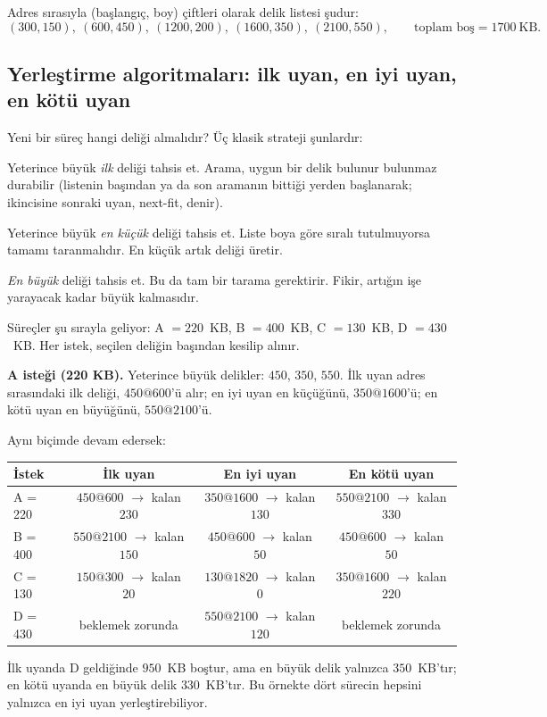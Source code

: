 \documentclass[11pt,a4paper]{article}
\begin{document}
Adres sırasıyla (başlangıç, boy) çiftleri olarak delik listesi şudur:
\[
(300,150),\ (600,450),\ (1200,200),\ (1600,350),\ (2100,550),\qquad \text{toplam boş} = 1700\ \text{KB}.
\]

\subsection{Yerleştirme algoritmaları: ilk uyan, en iyi uyan, en kötü uyan}

Yeni bir süreç hangi deliği almalıdır? Üç klasik strateji şunlardır:
\begin{description}[leftmargin=0pt,style=nextline,itemsep=0.3em]
  \item[İlk uyan (first-fit)] Yeterince büyük \emph{ilk} deliği tahsis et. Arama, uygun bir delik bulunur bulunmaz durabilir (listenin başından ya da son aramanın bittiği yerden başlanarak; ikincisine sonraki uyan, next-fit, denir).
  \item[En iyi uyan (best-fit)] Yeterince büyük \emph{en küçük} deliği tahsis et. Liste boya göre sıralı tutulmuyorsa tamamı taranmalıdır. En küçük artık deliği üretir.
  \item[En kötü uyan (worst-fit)] \emph{En büyük} deliği tahsis et. Bu da tam bir tarama gerektirir. Fikir, artığın işe yarayacak kadar büyük kalmasıdır.
\end{description}

\begin{example}
Süreçler şu sırayla geliyor: A $=220$~KB, B $=400$~KB, C $=130$~KB, D $=430$~KB. Her istek, seçilen deliğin başından kesilip alınır.

\textbf{A isteği (220 KB).} Yeterince büyük delikler: $450$, $350$, $550$. İlk uyan adres sırasındaki ilk deliği, $450@600$'ü alır; en iyi uyan en küçüğünü, $350@1600$'ü; en kötü uyan en büyüğünü, $550@2100$'ü.

Aynı biçimde devam edersek:
\begin{center}
\renewcommand{\arraystretch}{1.25}
\begin{tabular}{@{}lccc@{}}
\toprule
\textbf{İstek} & \textbf{İlk uyan} & \textbf{En iyi uyan} & \textbf{En kötü uyan} \\
\midrule
A = 220 & $450@600$ $\to$ kalan $230$ & $350@1600$ $\to$ kalan $130$ & $550@2100$ $\to$ kalan $330$ \\
B = 400 & $550@2100$ $\to$ kalan $150$ & $450@600$ $\to$ kalan $50$ & $450@600$ $\to$ kalan $50$ \\
C = 130 & $150@300$ $\to$ kalan $20$ & $130@1820$ $\to$ kalan $0$ & $350@1600$ $\to$ kalan $220$ \\
D = 430 & \textcolor{red!60!black}{beklemek zorunda} & $550@2100$ $\to$ kalan $120$ & \textcolor{red!60!black}{beklemek zorunda} \\
\bottomrule
\end{tabular}
\end{center}
İlk uyanda D geldiğinde $950$~KB boştur, ama en büyük delik yalnızca $350$~KB'tır; en kötü uyanda en büyük delik $330$~KB'tır. Bu örnekte dört sürecin hepsini yalnızca en iyi uyan yerleştirebiliyor.
\end{example}
\end{document}
